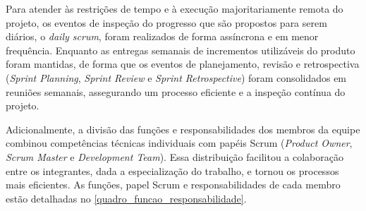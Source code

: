 \documentclass[
	12pt,				%
	openany,			%
	oneside,			%
	a4paper,			%
	english,			%
	french,				%
	spanish,			%
	brazil				%
	]{abntex2}
\begin{document}
Para atender às restrições de tempo e à execução majoritariamente remota do projeto, os eventos de inspeção do progresso que são propostos para serem diários, o \textit{daily scrum},  foram realizados de forma assíncrona e em menor frequência. Enquanto  as entregas semanais de incrementos utilizáveis do produto foram mantidas, de forma que os eventos de planejamento, revisão e retrospectiva (\textit{Sprint Planning}, \textit{Sprint Review} e \textit{Sprint Retrospective}) foram consolidados em reuniões semanais, assegurando um processo eficiente e a inspeção contínua do projeto. 

Adicionalmente, a divisão das funções e responsabilidades dos membros da equipe combinou competências técnicas individuais com papéis Scrum (\textit{Product Owner}, \textit{Scrum Master} e \textit{Development Team}). Essa distribuição facilitou a colaboração entre os integrantes, dada a especialização do trabalho, e tornou os processos mais eficientes. As funções, papel Scrum e responsabilidades de cada membro estão detalhadas no \autoref{quadro_funcao_responsabilidade}.
\end{document}
